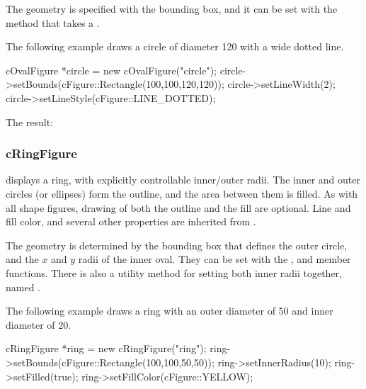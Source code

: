 The geometry is specified with the bounding box, and it can be set with the
 method that takes a .

The following example draws a circle of diameter 120 with a wide dotted line.

\begin{cpp}
cOvalFigure *circle = new cOvalFigure("circle");
circle->setBounds(cFigure::Rectangle(100,100,120,120));
circle->setLineWidth(2);
circle->setLineStyle(cFigure::LINE_DOTTED);
\end{cpp}


The result:

\begin{center}

\end{center}


\subsubsection{cRingFigure}
\label{sec:graphics:ringfigure}

 displays a ring, with explicitly controllable
inner/outer radii. The inner and outer circles (or ellipses) form the
outline, and the area between them is filled. As with all shape figures,
drawing of both the outline and the fill are optional. Line and fill color,
and several other properties are inherited from
.

The geometry is determined by the bounding box that defines the outer
circle, and the $x$ and $y$ radii of the inner oval. They can be set with
the ,  and 
member functions. There is also a utility method for setting both
inner radii together, named .

The following example draws a ring with an outer diameter of 50 and
inner diameter of 20.

\begin{cpp}
cRingFigure *ring = new cRingFigure("ring");
ring->setBounds(cFigure::Rectangle(100,100,50,50));
ring->setInnerRadius(10);
ring->setFilled(true);
ring->setFillColor(cFigure::YELLOW);
\end{cpp}


\begin{center}

\end{center}


